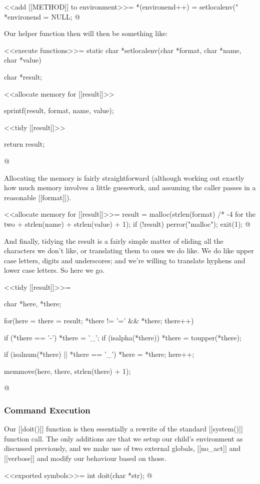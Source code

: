 \documentclass{article}
\begin{document}
<<add [[METHOD]] to environment>>=
*(environend++) = setlocalenv("%
*environend = NULL;
@

Our helper function then will then be something like:

<<execute functions>>=
static char *setlocalenv(char *format, char *name, char *value) {
	char *result;

	<<allocate memory for [[result]]>>

	sprintf(result, format, name, value);

	<<tidy [[result]]>>

	return result;
}
@

Allocating the memory is fairly straightforward (although working out
exactly how much memory involves a little guesswork, and assuming the
caller passes in a reasonable [[format]]).

<<allocate memory for [[result]]>>=
result = malloc(strlen(format)   /* -4 for the two %
                + strlen(name) 
                + strlen(value) 
                + 1);
if (!result) {
	perror("malloc");
	exit(1);
}
@

And finally, tidying the result is a fairly simple matter of eliding all
the characters we don't like, or translating them to ones we do like. We
do like upper case letters, digits and underscores; and we're willing
to translate hyphens and lower case letters. So here we go.

<<tidy [[result]]>>=
{
	char *here, *there;

	for(here = there = result; *there != '=' && *there; there++) {
		if (*there == '-') *there = '_';
		if (isalpha(*there)) *there = toupper(*there);

		if (isalnum(*there) || *there == '_') {
			*here = *there;
			here++;
		}
	}
	memmove(here, there, strlen(there) + 1);
}
@

\subsubsection{Command Execution}

Our [[doit()]] function is then essentially a rewrite of the standard
[[system()]] function call. The only additions are that we setup our
child's environment as discussed previously, and we make use of two
external globals, [[no_act]] and [[verbose]] and modify our behaviour
based on those.

<<exported symbols>>=
int doit(char *str);
@
\end{document}
